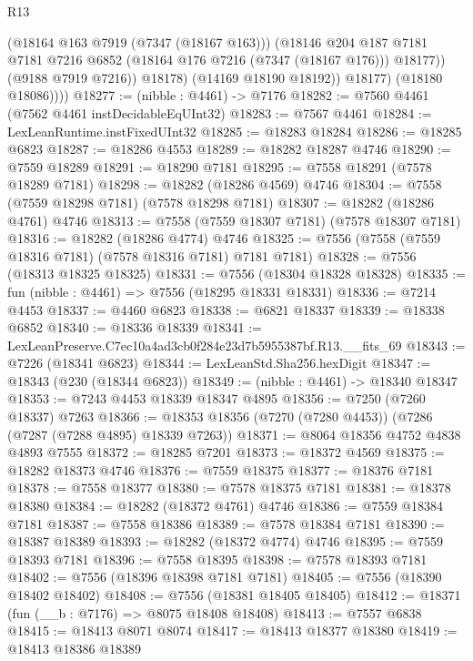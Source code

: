 \begin{lexlean}{R13}
\begin{coremodule}
                    (@18164 @163 @7919 (@7347 (@18167 @163)))
                    (@18146
                      @204
                      @187
                      @7181
                      @7181
                      @7216
                      @6852
                      (@18164 @176 @7216 (@7347 (@18167 @176)))
                      @18177))
                  (@9188 @7919 @7216))
                @18178)
              (@14169 @18190 @18192))
            @18177)
          (@18180 @18086))))
@18277 := (nibble : @4461) -> @7176
@18282 := @7560 @4461 (@7562 @4461 instDecidableEqUInt32)
@18283 := @7567 @4461
@18284 := LexLeanRuntime.instFixedUInt32
@18285 := @18283 @18284
@18286 := @18285 @6823
@18287 := @18286 @4553
@18289 := @18282 @18287 @4746
@18290 := @7559 @18289
@18291 := @18290 @7181
@18295 := @7558 @18291 (@7578 @18289 @7181)
@18298 := @18282 (@18286 @4569) @4746
@18304 := @7558 (@7559 @18298 @7181) (@7578 @18298 @7181)
@18307 := @18282 (@18286 @4761) @4746
@18313 := @7558 (@7559 @18307 @7181) (@7578 @18307 @7181)
@18316 := @18282 (@18286 @4774) @4746
@18325 := @7556 (@7558 (@7559 @18316 @7181) (@7578 @18316 @7181) @7181 @7181)
@18328 := @7556 (@18313 @18325 @18325)
@18331 := @7556 (@18304 @18328 @18328)
@18335 := fun (nibble : @4461) => @7556 (@18295 @18331 @18331)
@18336 := @7214 @4453
@18337 := @4460 @6823
@18338 := @6821 @18337
@18339 := @18338 @6852
@18340 := @18336 @18339
@18341 := LexLeanPreserve.C7ec10a4ad3cb0f284e23d7b5955387bf.R13.__fits_69
@18343 := @7226 (@18341 @6823)
@18344 := LexLeanStd.Sha256.hexDigit
@18347 := @18343 (@230 (@18344 @6823))
@18349 := (nibble : @4461) -> @18340 @18347
@18353 := @7243 @4453 @18339 @18347 @4895
@18356 := @7250 (@7260 @18337) @7263
@18366 := @18353 @18356 (@7270 (@7280 @4453)) (@7286 (@7287 (@7288 @4895) @18339 @7263))
@18371 := @8064 @18356 @4752 @4838 @4893 @7555
@18372 := @18285 @7201
@18373 := @18372 @4569
@18375 := @18282 @18373 @4746
@18376 := @7559 @18375
@18377 := @18376 @7181
@18378 := @7558 @18377
@18380 := @7578 @18375 @7181
@18381 := @18378 @18380
@18384 := @18282 (@18372 @4761) @4746
@18386 := @7559 @18384 @7181
@18387 := @7558 @18386
@18389 := @7578 @18384 @7181
@18390 := @18387 @18389
@18393 := @18282 (@18372 @4774) @4746
@18395 := @7559 @18393 @7181
@18396 := @7558 @18395
@18398 := @7578 @18393 @7181
@18402 := @7556 (@18396 @18398 @7181 @7181)
@18405 := @7556 (@18390 @18402 @18402)
@18408 := @7556 (@18381 @18405 @18405)
@18412 := @18371 (fun (__b : @7176) => @8075 @18408 @18408)
@18413 := @7557 @6838
@18415 := @18413 @8071 @8074
@18417 := @18413 @18377 @18380
@18419 := @18413 @18386 @18389

\end{coremodule}
\end{lexlean}
